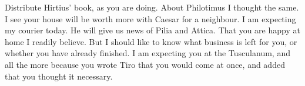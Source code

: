 

 Distribute Hirtius' book, as you are doing. About Philotimus I thought the same. I see your house will be worth more with Caesar for a neighbour. I am expecting my courier today. He will give us news of Pilia and Attica. That you are happy at home I readily believe. But I should like to know what business is left for you, or whether you have already finished. I am expecting you at the Tusculanum, and all the more because you wrote Tiro that you would come at once, and added that you thought it necessary.
